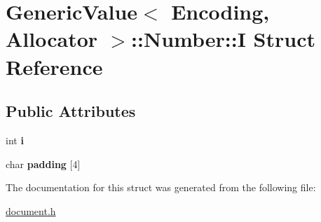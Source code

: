 \hypertarget{a00141}{}\section{Generic\+Value$<$ Encoding, Allocator $>$\+:\+:Number\+:\+:I Struct Reference}
\label{a00141}
\subsection*{Public Attributes}
\begin{DoxyCompactItemize}
\item 
int {\bfseries i}\hypertarget{a00141_ae0b250dc448d284cf9019f3932bfc380}{}\label{a00141_ae0b250dc448d284cf9019f3932bfc380}

\item 
char {\bfseries padding} \mbox{[}4\mbox{]}\hypertarget{a00141_aefc064997f30c9c0b2bdce187d1d4cce}{}\label{a00141_aefc064997f30c9c0b2bdce187d1d4cce}

\end{DoxyCompactItemize}


The documentation for this struct was generated from the following file\+:\begin{DoxyCompactItemize}
\item 
\hyperlink{a00473}{document.\+h}\end{DoxyCompactItemize}
